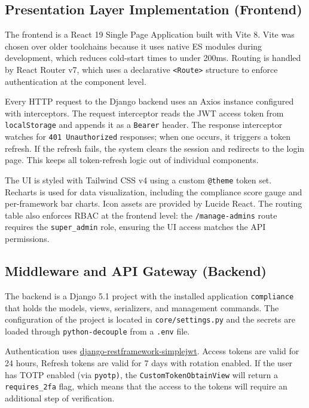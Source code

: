 \subsection{Presentation Layer Implementation (Frontend)}
The frontend is a React 19 Single Page Application built with Vite 8. Vite was chosen over older toolchains because it uses native ES modules during development, which reduces cold-start times to under 200ms. Routing is handled by React Router v7, which uses a declarative \texttt{<Route>} structure to enforce authentication at the component level.

Every HTTP request to the Django backend uses an Axios instance configured with interceptors. The request interceptor reads the JWT access token from \texttt{localStorage} and appends it as a \texttt{Bearer} header. The response interceptor watches for \texttt{401 Unauthorized} responses; when one occurs, it triggers a token refresh. If the refresh fails, the system clears the session and redirects to the login page. This keeps all token-refresh logic out of individual components.

The UI is styled with Tailwind CSS v4 using a custom \texttt{@theme} token set. Recharts is used for data visualization, including the compliance score gauge and per-framework bar charts. Icon assets are provided by Lucide React. The routing table also enforces RBAC at the frontend level: the \texttt{/manage-admins} route requires the \texttt{super\_admin} role, ensuring the UI access matches the API permissions.

\subsection{Middleware and API Gateway (Backend)}
The backend is a Django 5.1 project with the installed application \texttt{compliance} that holds the models, views, serializers, and management commands. The configuration of the project is located in \texttt{core/settings.py} and the secrets are loaded through \texttt{python-decouple} from a \texttt{.env} file.

Authentication uses \url{django-restframework-simplejwt}. Access tokens are valid for 24 hours, Refresh tokens are valid for 7 days with rotation enabled. If the user has TOTP enabled (via \texttt{pyotp)}, the \texttt{Custom\allowbreak Token\allowbreak Obtain\allowbreak View} will return a \texttt{requires\_\allowbreak 2fa} flag, which means that the access to the tokens will require an additional step of verification.

